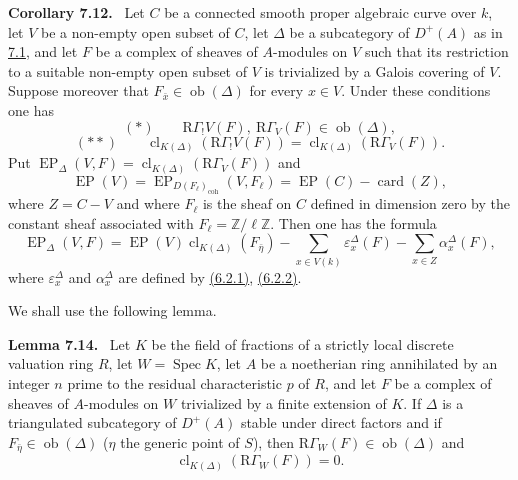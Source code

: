 \documentclass[11pt]{article}
\newenvironment{statement}[1]{\par\medskip\noindent\textbf{#1.}\ }{\par\medskip}
\DeclareMathOperator{\Spec}{Spec}
\providecommand{\EP}{\operatorname{EP}}
\providecommand{\coh}{\mathrm{coh}}
\providecommand{\Ob}{\operatorname{ob}}
\providecommand{\Ob}{\operatorname{ob}}
\providecommand{\Spec}{\operatorname{Spec}}
\providecommand{\EP}{\operatorname{EP}}
\providecommand{\Spec}{\operatorname{Spec}}
\providecommand{\Ob}{\operatorname{Ob}}
\providecommand{\coh}{\mathrm{coh}}
\providecommand{\clK}[1]{\operatorname{cl}_{K(#1)}}
\providecommand{\RG}{\mathrm R\Gamma}
\providecommand{\Spec}{\operatorname{Spec}}
\providecommand{\Ob}{\operatorname{ob}}
\providecommand{\Spec}{\operatorname{Spec}}
\providecommand{\Ob}{\operatorname{Ob}}
\begin{document}
\label{sga5:X:corollary:7.12}\begin{statement}{Corollary 7.12}
Let $C$ be a connected smooth proper algebraic curve over $k$, let $V$ be a non-empty open subset of $C$, let $\Delta$ be a subcategory of $D^+(A)$ as in \hyperref[sga5:X:theorem:7.1]{7.1}, and let $F$ be a complex of sheaves of $A$-modules on $V$ such that its restriction to a suitable non-empty open subset of $V$ is trivialized by a Galois covering of $V$. Suppose moreover that $F_{\bar x}\in\Ob(\Delta)$ for every $x\in V$. Under these conditions one has
\[
(*)\qquad \RG_!V(F),\ \RG_V(F)\in\Ob(\Delta),
\]
\[
(**)\qquad
\clK{\Delta}(\RG_!V(F))=\clK{\Delta}(\RG_V(F)).
\]
Put $\EP_\Delta(V,F)=\clK{\Delta}(\RG_V(F))$ and
\[
\EP(V)=\EP_{D(F_\ell)_{\coh}}(V,F_\ell)=\EP(C)-\operatorname{card}(Z),
\]
where $Z=C-V$ and where $F_\ell$ is the sheaf on $C$ defined in dimension zero by the constant sheaf associated with $F_\ell=\mathbb Z/\ell\mathbb Z$. Then one has the formula
\[
\EP_\Delta(V,F)
=
\EP(V)\clK{\Delta}(F_{\bar\eta})
-\sum_{x\in V(k)}\varepsilon_x^\Delta(F)
-\sum_{x\in Z}\alpha_x^\Delta(F),
\tag{7.13}\label{sga5:X:equation:7.13}
\]
where $\varepsilon_x^\Delta$ and $\alpha_x^\Delta$ are defined by \hyperref[sga5:X:equation:6.2.1]{(6.2.1)}, \hyperref[sga5:X:equation:6.2.2]{(6.2.2)}.
\end{statement}

We shall use the following lemma.

\label{sga5:X:lemma:7.14}\begin{statement}{Lemma 7.14}
Let $K$ be the field of fractions of a strictly local discrete valuation ring $R$, let $W=\Spec K$, let $A$ be a noetherian ring annihilated by an integer $n$ prime to the residual characteristic $p$ of $R$, and let $F$ be a complex of sheaves of $A$-modules on $W$ trivialized by a finite extension of $K$. If $\Delta$ is a triangulated subcategory of $D^+(A)$ stable under direct factors and if $F_{\bar\eta}\in\Ob(\Delta)$ ($\eta$ the generic point of $S$), then $\RG_W(F)\in\Ob(\Delta)$ and
\[
\clK{\Delta}(\RG_W(F))=0.
\]
\end{statement}
\end{document}
